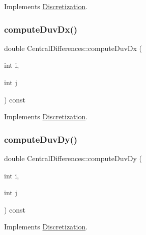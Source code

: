 Implements \mbox{\hyperlink{classDiscretization_acca6bf193e0e91f645d292527299254b}{Discretization}}.

\mbox{\label{classCentralDifferences_a46104c3604f533bda430fc75110c956a}} 
\subsubsection{\texorpdfstring{computeDuvDx()}{computeDuvDx()}}
{\footnotesize\ttfamily double Central\+Differences\+::compute\+Duv\+Dx (\begin{DoxyParamCaption}\item[{int}]{i,  }\item[{int}]{j }\end{DoxyParamCaption}) const\hspace{0.3cm}{\ttfamily [virtual]}}



Implements \mbox{\hyperlink{classDiscretization_ab1c2aa237e13e7c4c9edd429de656795}{Discretization}}.

\mbox{\label{classCentralDifferences_a9d2f160a453d61537ff680afc2f9e67a}} 
\subsubsection{\texorpdfstring{computeDuvDy()}{computeDuvDy()}}
{\footnotesize\ttfamily double Central\+Differences\+::compute\+Duv\+Dy (\begin{DoxyParamCaption}\item[{int}]{i,  }\item[{int}]{j }\end{DoxyParamCaption}) const\hspace{0.3cm}{\ttfamily [virtual]}}



Implements \mbox{\hyperlink{classDiscretization_a0bab86aef10a72e01b4f8102a3c91f84}{Discretization}}.

\mbox{\label{classCentralDifferences_a1fc0c5d01fcc12943e1f04e1b2548c92}} 
